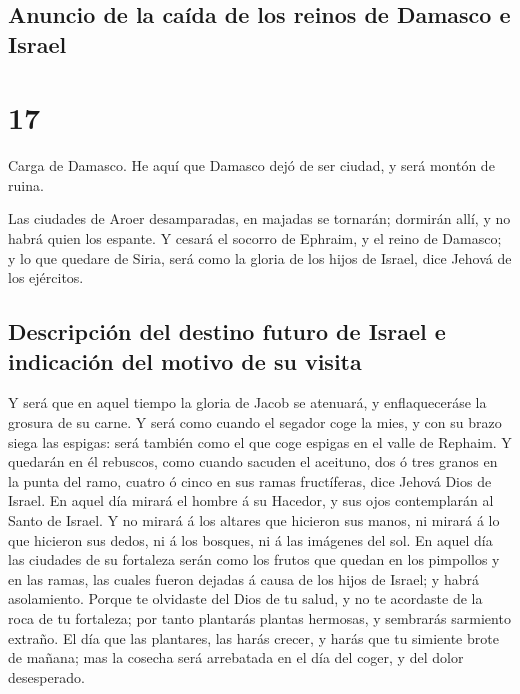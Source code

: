 \hypertarget{anuncio-de-la-cauxedda-de-los-reinos-de-damasco-e-israel}{%
\subsection{Anuncio de la caída de los reinos de Damasco e
Israel}\label{anuncio-de-la-cauxedda-de-los-reinos-de-damasco-e-israel}}

\hypertarget{section-23-17}{%
\section{17}\label{section-23-17}}

 Carga de Damasco. He aquí que Damasco dejó de ser ciudad,
y será montón de ruina.

 Las ciudades de Aroer desamparadas, en majadas se
tornarán; dormirán allí, y no habrá quien los espante.  Y
cesará el socorro de Ephraim, y el reino de Damasco; y lo que quedare de
Siria, será como la gloria de los hijos de Israel, dice Jehová de los
ejércitos.

\hypertarget{descripciuxf3n-del-destino-futuro-de-israel-e-indicaciuxf3n-del-motivo-de-su-visita}{%
\subsection{Descripción del destino futuro de Israel e indicación del
motivo de su
visita}\label{descripciuxf3n-del-destino-futuro-de-israel-e-indicaciuxf3n-del-motivo-de-su-visita}}

 Y será que en aquel tiempo la gloria de Jacob se
atenuará, y enflaqueceráse la grosura de su carne.  Y será
como cuando el segador coge la mies, y con su brazo siega las espigas:
será también como el que coge espigas en el valle de Rephaim.
 Y quedarán en él rebuscos, como cuando sacuden el
aceituno, dos ó tres granos en la punta del ramo, cuatro ó cinco en sus
ramas fructíferas, dice Jehová Dios de Israel.  En aquel
día mirará el hombre á su Hacedor, y sus ojos contemplarán al Santo de
Israel.  Y no mirará á los altares que hicieron sus manos,
ni mirará á lo que hicieron sus dedos, ni á los bosques, ni á las
imágenes del sol.  En aquel día las ciudades de su
fortaleza serán como los frutos que quedan en los pimpollos y en las
ramas, las cuales fueron dejadas á causa de los hijos de Israel; y habrá
asolamiento.  Porque te olvidaste del Dios de tu salud, y
no te acordaste de la roca de tu fortaleza; por tanto plantarás plantas
hermosas, y sembrarás sarmiento extraño.  El día que las
plantares, las harás crecer, y harás que tu simiente brote de mañana;
mas la cosecha será arrebatada en el día del coger, y del dolor
desesperado.

